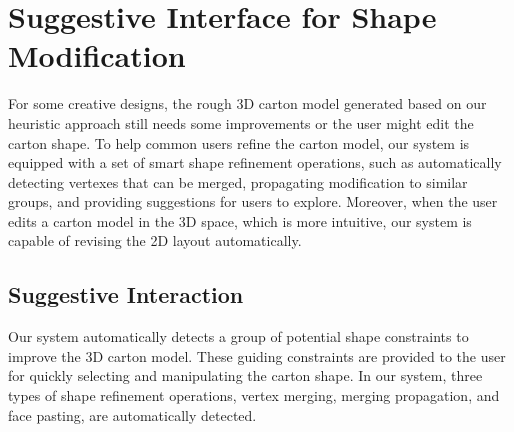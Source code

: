 \section{Suggestive Interface for Shape Modification }\label{sec:interaction}
%
For some creative designs, the rough 3D carton model generated based on our heuristic approach still needs some improvements or the user might edit the carton shape. 
To help common users refine the carton model, our system is equipped with a set of smart shape refinement operations, such as automatically detecting vertexes that can be merged, propagating modification to similar groups, and providing suggestions for users to explore. 
%
Moreover, when the user edits a carton model in the 3D space, which is more intuitive, our system is capable of revising the 2D layout automatically. 



\subsection{Suggestive Interaction}

Our system automatically detects a group of potential shape constraints to improve the 3D carton model.
%
These guiding constraints are provided to the user for quickly selecting and manipulating the carton shape.
In our system, three types of shape refinement operations, vertex merging, merging propagation, and face pasting, are automatically detected.


